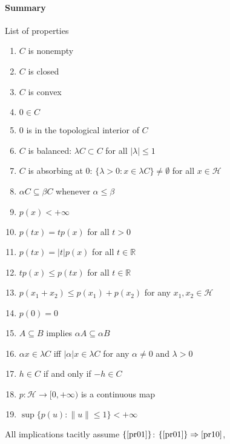 \documentclass[a4paper]{article}
\newcommand{\Hcal}{\mathcal{H}}
\newcommand{\real}{\mathbb{R}}
\begin{document}

\paragraph{Summary} %
\label{par:summary}

List of properties
\begin{enumerate}
  \item \label{pr01}
    $C$ is nonempty
  \item \label{pr02}
    $C$ is closed
  \item \label{pr03}
    $C$ is convex
  \item \label{pr04}
    $0 \in C$
  \item \label{pr05}
    $0$ is in the topological interior of $C$
  \item \label{pr06}
    $C$ is balanced: $\lambda C \subset C$ for all $\lvert \lambda \rvert \leq 1$
  \item \label{pr07}
    $C$ is absorbing at $0$: $\{\lambda>0\colon x \in \lambda C \} \neq \emptyset$
    for all $x\in \Hcal$
  \item \label{pr08}
    $\alpha C \subseteq \beta C$ whenever $\alpha \leq \beta$
  \item \label{pr09}
    $p(x) < +\infty$
  \item \label{pr10}
    $p(tx) = t p(x)$ for all $t > 0$
  \item \label{pr11}
    $p(tx) = \lvert t \rvert p(x)$ for all $t \in \real$
  \item \label{pr12}
    $t p(x) \leq p(t x)$ for all $t \in \real$
  \item \label{pr13}
    $p(x_1 + x_2) \leq p(x_1) + p(x_2)$ for any $x_1, x_2 \in \Hcal$
  \item \label{pr14}
    $p(0) = 0$
  \item \label{pr15}
    $A \subseteq B$ implies $\alpha A \subseteq \alpha B$
  \item \label{pr16}
    $\alpha x \in \lambda C$ iff $\lvert \alpha \rvert x \in \lambda C$ for any
    $\alpha \neq 0$ and $\lambda > 0$
  \item \label{pr17}
    $h \in C$ if and only if $-h \in C$
  \item \label{pr18}
    $p\colon \Hcal \to [0, +\infty)$ is a continuous map
  \item \label{pr19}
    $\sup\{p(u)\colon \|u\|\leq 1\} < +\infty$
\end{enumerate}
All implications tacitly assume $\{\ref{pr01}\}$:
$\{\ref{pr01}\} \Rightarrow \ref{pr10}$,
\end{document}
